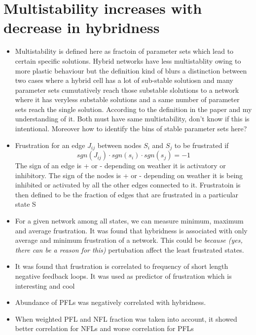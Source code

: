 \documentclass{article}
\begin{document}
\section{Multistability increases with decrease in hybridness}
\begin{itemize}

\item Multistability is defined here as fractoin of parameter sets which lead to certain specific solutions. Hybrid networks have less multistablity owing to more plastic behaviour but the definition kind of blurs a distinction between two cases where a hybrid cell has a lot of sub-stable solutiosn and many parameter sets cumutatively reach those substable slolutions to a network where it has veryless substable solutions and a same number of parameter sets reach the single solution. According to the definition in the paper and my understanding of it. Both must have same multistability, don't know if this is intentional. Moreover how to identify the bins of stable parameter sets here? 


\item Frustration for an edge $ J_{ij} $ between nodes $ S_i $ and $ S_j $ to be frustrated if 
	\[  sgn(J_{ij}) \cdot sgn(s_i) \cdot sgn(s_j) = -1                    \]The sign of an edge is + or - depending on weather it is activatory or inhibitory. The sign of the nodes is + or - depending on weather it is being inhibited or activated by all the other edges connected to it. Frustratoin is then defined to be the fraction of edges that are frustrated in a particular state S 



\item For a given network among all states, we can measure minimum, maximum and average frustration. It was found that hybridness is associated with only average and minimum frustration of a network. This could be \textit{ because (yes, there can be a reason for this) } pertubation affect the least frustrated states. 

\item It was found that frustration is correlated to frequency of short length negative feedback loops. It was used as predictor of frustration which is interesting and cool

\item Abundance of PFLs was negatively correlated with hybridness.

\item When weighted PFL and NFL fraction was taken into account, it showed better correlation for NFLs and worse correlation for PFLs 
\end{itemize}
\end{document}
